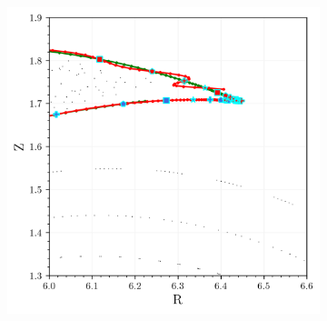 \begin{figure}[h!]
\begin{subfigure}[c]{0.49\textwidth}
        \includegraphics[width=\textwidth]{images/high-aspect-ratio/closeup.png}
        \caption{}
        \label{}
    \end{subfigure}
    \caption{}
    \label{}
\end{figure}